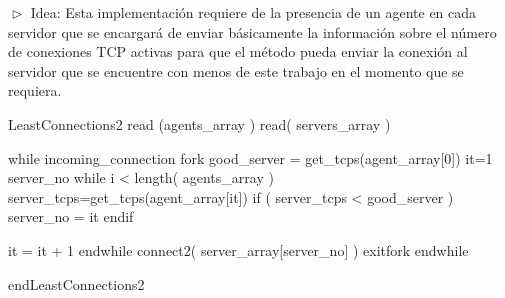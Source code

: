 
$\vartriangleright$ Idea: Esta implementación requiere de la presencia de un agente en cada servidor que se encargará de enviar básicamente
la información sobre el número de conexiones TCP activas para que el método pueda enviar la conexión al servidor que se encuentre con menos de
este trabajo en el momento que se requiera.

\begin{verbatimtab}[\myTabs]

LeastConnections2
	read (agents_array )
	read( servers_array )
	
	while incoming_connection
		fork
			good_server = get_tcps(agent_array[0])
			it=1
			server_no
			while i < length( agents_array )
				server_tcps=get_tcps(agent_array[it])
				if ( server_tcps < good_server )
					server_no = it
				endif
			
			it = it + 1
			endwhile
			connect2( server_array[server_no] )
		exitfork
	endwhile
	
endLeastConnections2

\end{verbatimtab}